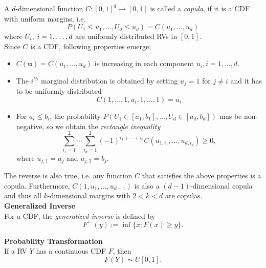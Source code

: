 
A $d$-dimensional function $C: [0,1]^d \rightarrow [0,1]$ is called a \textit{copula}, if it is a \ac{CDF} with uniform margins, i.e.
\begin{equation}
P\left(U_{1} \leq u_{1}, \ldots, U_{d} \leq u_{d}\right)=C\left(u_{1}, \ldots, u_{d}\right)
\end{equation}
where 
$ U_{i}, \hspace{0.25em} i = 1, \ldots, d $ 
are uniformly distributed \acp{RV} in $[0,1]$.\\
Since $C$ is a \ac{CDF}, following properties emerge:
\begin{itemize}
\item $C(\mathbf{u})=C\left(u_{1}, \ldots, u_{d}\right)$ is increasing in each component $u_i, i = 1, \ldots, d$.
\item The $i^{th}$ marginal distribution is obtained by setting $u_j = 1$ for $j \neq i$ and it has to be uniformly distributed 
\begin{equation}
C\left(1, \ldots, 1, u_{i}, 1, \ldots, 1\right)=u_{i}
\end{equation}
\item For $a_i \leq b_i$, the probability $P\left(U_{1} \in\left[a_{1}, b_{1}\right], \ldots, U_{d} \in\left[a_{d}, b_{d}\right]\right)$ mus be non-negative, so we obtain the \textit{rectangle inequality} 
\begin{equation}
\sum_{i_{1}=1}^{2} \cdots \sum_{i_{d}=1}^{2}(-1)^{i_{1}+\cdots+i_{d}} C\left(u_{1, i_{1}}, \ldots, u_{d, i_{d}}\right) \geq 0,
\end{equation}
where $u_{j,1} = a_j$ and $u_{j,2} = b_j$.
\label{eq:rectangle_inequality}
\end{itemize}
The reverse is also true, i.e. any function $C$ that satisfies the above properties is a copula. Furthermore, $C\left(1, u_{1}, \ldots, u_{d-1}\right)$ is also a $(d-1)$-dimensional copula and thus all $k$-dimensional margins with $2<k<d$ are copulas.\\ 

\textbf{Generalized Inverse}\\
For a \ac{CDF}, the \textit{generalized inverse} is defined by
\begin{equation}
F^{\leftarrow}(y):=\inf \{x: F(x) \geq y\}.
\label{eq:generalized_inverse}
\end{equation}


\textbf{Probability Transformation}\\
If a \ac{RV} $Y$ has a continuous \ac{CDF} $F$, then
\begin{equation}
F(Y) \sim U[0,1].
\label{eq:probability_transformation}
\end{equation}



